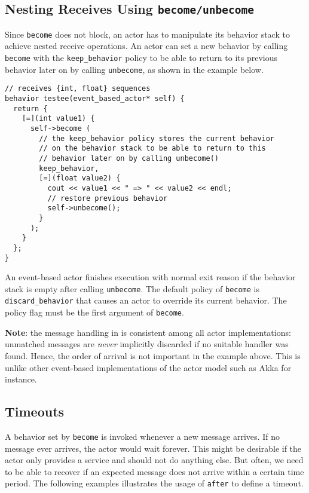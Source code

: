 \clearpage
\subsection{Nesting Receives Using \lstinline^become/unbecome^}

Since \lstinline^become^ does not block, an actor has to manipulate its behavior stack to achieve nested receive operations.
An actor can set a new behavior by calling \lstinline^become^ with the \lstinline^keep_behavior^ policy to be able to return to its previous behavior later on by calling \lstinline^unbecome^, as shown in the example below.

\begin{lstlisting}
// receives {int, float} sequences
behavior testee(event_based_actor* self) {
  return {
    [=](int value1) {
      self->become (
        // the keep_behavior policy stores the current behavior
        // on the behavior stack to be able to return to this
        // behavior later on by calling unbecome()
        keep_behavior,
        [=](float value2) {
          cout << value1 << " => " << value2 << endl;
          // restore previous behavior
          self->unbecome();
        }
      );
    }
  };
}
\end{lstlisting}

An event-based actor finishes execution with normal exit reason if the behavior stack is empty after calling \lstinline^unbecome^.
The default policy of \lstinline^become^ is \lstinline^discard_behavior^ that causes an actor to override its current behavior.
The policy flag must be the first argument of \lstinline^become^.

\textbf{Note}: the message handling in \lib is consistent among all actor implementations: unmatched messages are \textit{never} implicitly discarded if no suitable handler was found.
Hence, the order of arrival is not important in the example above.
This is unlike other event-based implementations of the actor model such as Akka for instance.

\clearpage
\subsection{Timeouts}
\label{Sec::Receive::Timeouts}

A behavior set by \lstinline^become^ is invoked whenever a new message arrives.
If no message ever arrives, the actor would wait forever.
This might be desirable if the actor only provides a service and should not do anything else.
But often, we need to be able to recover if an expected message does not arrive within a certain time period. The following examples illustrates the usage of \lstinline^after^ to define a timeout.

